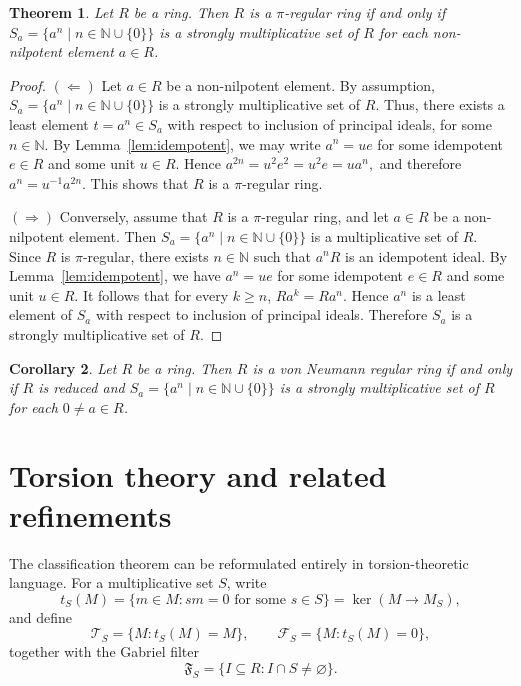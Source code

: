 \documentclass[11pt]{amsart}
\newtheorem{theorem}{Theorem}[section]
\newtheorem{corollary}[theorem]{Corollary}
\theoremstyle{definition}
\theoremstyle{remark}
\begin{document}
\begin{theorem}
Let $R$ be a ring. Then $R$ is a $\pi$-regular ring if and only if $S_a=\{a^n \mid n\in\mathbb{N}\cup\{0\}\}$ is a strongly multiplicative set of $R$ for each non-nilpotent element $a\in R$.
\end{theorem}

\begin{proof}
$(\Leftarrow)$ Let $a\in R$ be a non-nilpotent element. By assumption, $S_a=\{a^n \mid n\in\mathbb{N}\cup\{0\}\}$ is a strongly multiplicative set of $R$. Thus, there exists a least element $t=a^n\in S_a$ with respect to inclusion of principal ideals, for some $n\in\mathbb{N}$. By Lemma~\ref{lem:idempotent}, we may write $a^n=ue$ for some idempotent $e\in R$ and some unit $u\in R$. Hence $a^{2n}=u^2e^2=u^2e=ua^n,$ and therefore $a^n=u^{-1}a^{2n}.$
This shows that $R$ is a $\pi$-regular ring.

$(\Rightarrow)$ Conversely, assume that $R$ is a $\pi$-regular ring, and let $a\in R$ be a non-nilpotent element. Then $S_a=\{a^n \mid n\in\mathbb{N}\cup\{0\}\}$ is a multiplicative set of $R$. Since $R$ is $\pi$-regular, there exists $n\in\mathbb{N}$ such that $a^nR$ is an idempotent ideal. By Lemma~\ref{lem:idempotent}, we have $a^n=ue$ for some idempotent $e\in R$ and some unit $u\in R$. It follows that for every $k\geq n$, $Ra^k=Ra^n.$
Hence $a^n$ is a least element of $S_a$ with respect to inclusion of principal ideals. Therefore $S_a$ is a strongly multiplicative set of $R$.
\end{proof}

\begin{corollary}
Let $R$ be a ring. Then $R$ is a von Neumann regular ring if and only if $R$ is reduced and $S_a=\{a^n \mid n\in\mathbb{N}\cup\{0\}\}$ is a strongly multiplicative set of $R$ for each $0\neq a\in R$.
\end{corollary}


\section{Torsion theory and related refinements}

The classification theorem can be reformulated entirely in torsion-theoretic language.
For a multiplicative set $S$, write
\[
t_S(M)=\{m \in M : sm=0 \text{ for some } s \in S\}
=
\ker(M \to M_S),
\]
and define
\[
\mathcal T_S=\{M : t_S(M)=M\},
\qquad
\mathcal F_S=\{M : t_S(M)=0\},
\]
together with the Gabriel filter
\[
\mathfrak F_S=\{I \subseteq R : I \cap S \neq \varnothing\}.
\]
\end{document}
